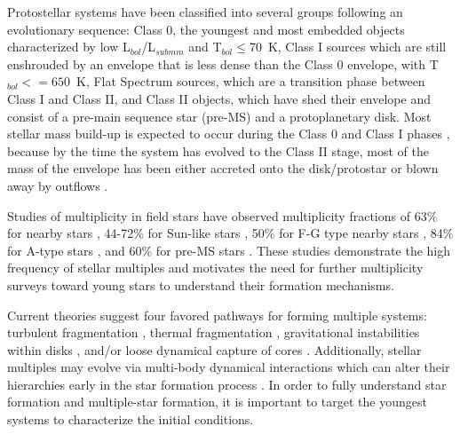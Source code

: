 \documentclass[twocolumn, 12pt,trackchanges]{aastex63}
\newcommand{\ab}{$\sim$}
\newcommand{\tbol}{T$_{bol}$}
\begin{document}
Protostellar systems have been classified into several groups following an evolutionary sequence: Class 0, the youngest and most embedded objects characterized by low L$_{bol}$/L$_{submm}$ \citep[$<5\times10^{-3}$; ][]{1993ApJ...406..122A} and \tbol\space$\le$70~K, Class I sources which are still enshrouded by an envelope that is less dense than the Class 0 envelope, with T$_{bol}<=650$~K, Flat Spectrum sources, which are a  transition phase between Class I and Class II, and Class II objects, which have shed their envelope and consist of a pre-main sequence star (pre-MS) and a protoplanetary disk. Most stellar mass build-up is expected to occur during the Class 0 and Class I phases \citep[$<5\times10^{5}$~yr; e.g.][]{2018arXiv180711262K,1987IAUS..115....1L}, because by the time the system has evolved to the Class II stage, most of the mass of the envelope has been either accreted onto the disk/protostar or blown away by outflows \citep[][]{2006ApJ...646.1070A, 2014ApJ...784...61O}.

Studies of multiplicity in field stars have observed multiplicity fractions of 63\% for nearby stars \citep[][]{1962AJ.....67R.590W}, 44-72\% for Sun-like stars \citep[][]{1983ARAA..21..343A, 2010ApJS..190....1R}, 50\% for F-G type nearby stars \citep[][]{1991AA...248..485D}, 84\% for A-type stars \citep[][]{2017ApJS..230...15M}, and 60\% for pre-MS stars \citep[][]{1994ARAA..32..465M}. These studies demonstrate the high frequency of stellar multiples and motivates the need for further multiplicity surveys toward young stars to understand their formation mechanisms.

Current theories suggest four favored pathways for forming multiple systems: turbulent fragmentation \citep[on scales \ab1000s of au; e.g.][]{2004ApJ...617..559P, 2004ApJ...600..769F}, thermal fragmentation \citep[on scales \ab1000s of au; e.g.][]{2010ApJ...725.1485O, 2013ApJ...764..136B}, gravitational instabilities within disks \citep[on scales \ab100s of au; e.g.][]{1989ApJ...347..959A, 2009MNRAS.392..413S, 2010ApJ...708.1585K}, and/or loose dynamical capture of cores \citep[\ab10$^{4-5}$~au scales][]{2002MNRAS.336..705B, 2019ApJ...887..232L}. Additionally, stellar multiples may evolve via multi-body dynamical interactions which can alter their hierarchies early in the star formation process \citep{2002MNRAS.336..705B, 2010MNRAS.404..721M, 2012Natur.492..221R}. In order to fully understand star formation and multiple-star formation, it is important to target the youngest systems to characterize the initial conditions.
\end{document}
